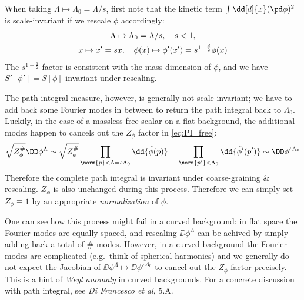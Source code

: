 \documentclass[a4paper
	,10pt
]{article}
\begin{document}
	When taking $\Lambda\mapsto \Lambda_0 = \Lambda / s$, first note that the kinetic term $\int \dd[d]{x} (\pd\phi)^2$ is scale-invariant if we rescale $\phi$ accordingly:
	\begin{gather}
		\Lambda\mapsto \Lambda_0 = \Lambda / s,
	\quad
		s < 1,
	\notag\\
		x\mapsto x' = sx,
	\quad
		\phi(x) \mapsto
		\phi'(x') = s^{1 - \frac{d}{2}} \phi(x)
	\end{gather}
	The $s^{1 - \frac{d}{2}}$ factor is consistent with the mass dimension of $\phi$, and we have $S'[\phi'] = S[\phi]$ invariant under rescaling. 
	
\pagebreak[4]
	
	The path integral measure, however, is generally not scale-invariant; we have to add back some Fourier modes in between to return the path integral back to $\Lambda_0$. Luckily, in the case of a massless free scalar on a flat background, the additional modes happen to cancels out the $Z_\phi$ factor in \eqref{eq:PI_free}:
	\begin{equation}
		\sqrt{Z_\phi^\#} \DD\phi^{\Lambda}
		\sim \sqrt{Z_\phi^\#}
			\prod_{\norm{p} < \Lambda = s\Lambda_0}
			\dd{\tilde{\phi}(p)}
		= \prod_{\norm{p'} < \Lambda_0}
			\dd{\tilde{\phi}'(p')}
		\sim \DD\phi'^{\,\Lambda_0}
	\end{equation}
	Therefore the complete path integral is invariant under coarse-graining \& rescaling. $Z_\phi$ is also unchanged during this process. Therefore we can simply set $Z_\phi \equiv 1$ by an appropriate \textit{normalization} of $\phi$.
	
	One can see how this process might fail in a curved background: in flat space the Fourier modes are equally spaced, and rescaling $\DD\phi^{\Lambda}$ can be achived by simply adding back a total of $\#$ modes. However, in a curved background the Fourier modes are complicated (e.g.\ think of spherical harmonics) and we generally do not expect the Jacobian of $\DD\phi^{\Lambda} \mapsto \DD\phi'^{\,\Lambda_0}$ to cancel out the $Z_\phi$ factor precisely. This is a hint of \textit{Weyl anomaly} in curved backgrounds. For a concrete discussion with path integral, see \textit{Di Francesco et al}, 5.A. 
	
	
\end{document}
